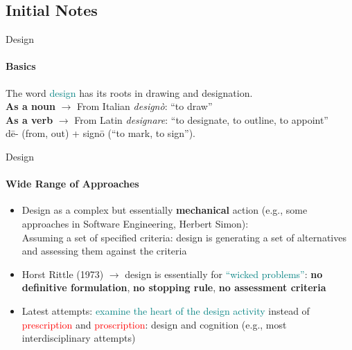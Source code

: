 \documentclass[
	11pt,
	aspectratio=169,
]{beamer}
\begin{document}
        \subsection{Initial Notes}
            \begin{frame}{Design}
                \framesubtitle{Basics}
                The word \textcolor{teal}{design} has its roots in drawing and designation. \\
        	    \textbf{As a noun} $\longrightarrow$ From Italian \textit{\rm designò}: ``to draw''\\
        	    \textbf{As a verb} $\longrightarrow$ From Latin \textit{\rm designare}: ``to designate, to outline, to appoint''\\
        	    \centering dē- (from, out) + signō (``to mark, to sign''). 
            \end{frame}
            \begin{frame}{Design}
                \framesubtitle{Wide Range of Approaches}
        		\begin{itemize}
        			\item<1->Design as a complex but essentially \textbf{mechanical} action (e.g., some approaches in Software Engineering, Herbert Simon):\\
        			    Assuming a set of specified criteria: design is generating a set of  alternatives and assessing them against the criteria
        			\item<2-> Horst Rittle (1973) $\longrightarrow$ design is essentially for \textcolor{teal}{``wicked problems''}:
        			\textbf{no definitive formulation}, \textbf{no stopping rule}, \textbf{no assessment criteria}
        			\item<3->Latest attempts: \textcolor{teal}{examine the heart of the design activity} instead of \textcolor{red}{prescription} and \textcolor{red}{proscription}: design and cognition (e.g., most interdisciplinary attempts)
        		\end{itemize}
            \end{frame}
\end{document}
